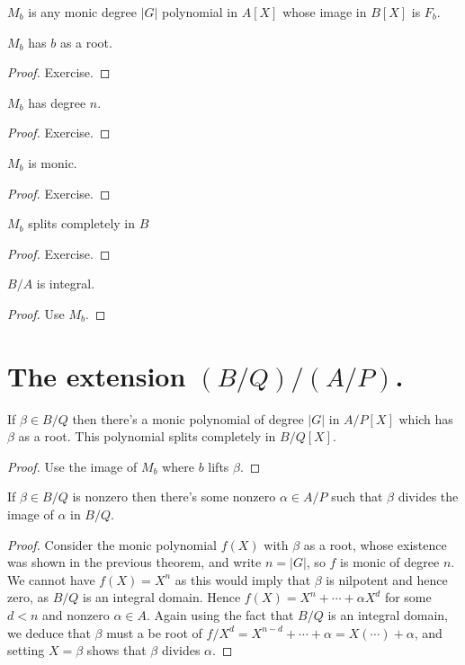\begin{definition}
  \label{MulSemiringAction.CharacteristicPolynomial.M}
  \leanok
  $M_b$ is any monic degree $|G|$ polynomial in $A[X]$ whose
  image in $B[X]$ is $F_b$.
\end{definition}

\begin{lemma}
  $M_b$ has $b$ as a root.
\end{lemma}
\begin{proof} Exercise.
\end{proof}
\begin{lemma}
  $M_b$ has degree $n$.
\end{lemma}
\begin{proof} Exercise.
\end{proof}
\begin{lemma} $M_b$ is monic.
\end{lemma}
\begin{proof}
  Exercise.
\end{proof}
\begin{lemma} $M_b$ splits completely in $B$
\end{lemma}
\begin{proof} Exercise.
\end{proof}

\begin{theorem} $B/A$ is integral.
\end{theorem}
\begin{proof} Use $M_b$.
\end{proof}

\section{The extension $(B/Q)/(A/P)$.}

\begin{theorem}
  \label{dunno}
  If $\beta\in B/Q$ then there's a monic polynomial of degree $|G|$ in $A/P[X]$
  which has $\beta$ as a root. This polynomial splits completely in $B/Q[X]$.
\end{theorem}
\begin{proof}
  Use the image of $M_b$ where $b$ lifts $\beta$.
\end{proof}

\begin{corollary}
  If $\beta\in B/Q$ is nonzero then there's some nonzero $\alpha\in A/P$
  such that $\beta$ divides the image of $\alpha$ in $B/Q$.
\end{corollary}
\begin{proof} Consider the monic polynomial $f(X)$ with $\beta$ as a root, whose
  existence was shown in the previous theorem, and write $n=|G|$, so $f$ is monic
  of degree $n$. We cannot have $f(X)=X^n$ as this would imply that $\beta$ is
  nilpotent and hence zero, as $B/Q$ is an integral domain. Hence $f(X)=X^n+\cdots +\alpha X^d$
  for some $d<n$ and nonzero $\alpha\in A$. Again using the fact that $B/Q$ is an integral domain, we
  deduce that $\beta$ must a be root of $f/X^d=X^{n-d}+\cdots+\alpha=X(\cdots)+\alpha$, and setting
  $X=\beta$ shows that $\beta$ divides $\alpha$.
\end{proof}

